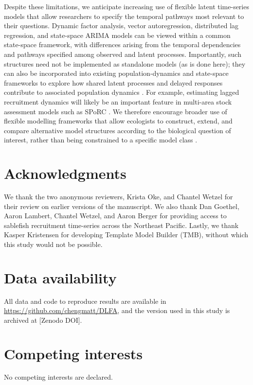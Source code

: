 \documentclass[12pt]{article}
\begin{document}
Despite these limitations, we anticipate increasing use of flexible latent time-series models that
allow researchers to specify the temporal pathways most relevant to
their questions. Dynamic factor analysis, vector autoregression,
distributed lag regression, and state-space ARIMA models can be viewed
within a common state-space framework, with differences arising from the
temporal dependencies and pathways specified among observed and latent
processes. Importantly, such structures need not be implemented as
standalone models (as is done here); they can also be incorporated into
existing population-dynamics and state-space frameworks to explore how
shared latent processes and delayed responses contribute to associated
population dynamics \citep{champagnat_causal_2026}. For example,
estimating lagged recruitment dynamics will likely be an important
feature in multi-area stock assessment models such as SPoRC
\citep{cheng_sporc_2026}. We therefore encourage broader use of flexible
modelling frameworks that allow ecologists to construct, extend, and
compare alternative model structures according to the biological
question of interest, rather than being constrained to a specific model
class \citep{thorson_dynamic_2024}.

\section*{Acknowledgments}
We thank the two anonymous reviewers, Krista Oke, and Chantel Wetzel for
their review on earlier versions of the manuscript. We also thank Dan
Goethel, Aaron Lambert, Chantel Wetzel, and Aaron Berger for providing
access to sablefish recruitment time-series across the Northeast
Pacific. Lastly, we thank Kasper Kristensen for developing Template
Model Builder (TMB), without which this study would not be possible.

\section*{Data availability}
All data and code to reproduce results are available in
\url{https://github.com/chengmatt/DLFA}, and the version used in this
study is archived at [Zenodo DOI].

\section*{Competing interests}
No competing interests are declared.

\clearpage

\end{document}
